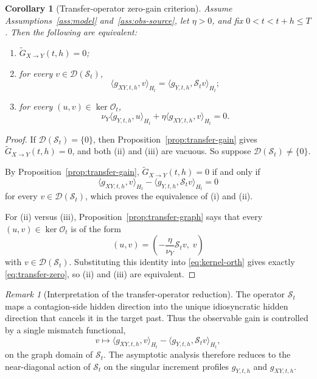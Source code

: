 \documentclass[11pt,a4paper]{amsart}
\theoremstyle{plain}
\newtheorem{corollary}[theorem]{Corollary}
\theoremstyle{definition}
\theoremstyle{remark}
\newtheorem{remark}[theorem]{Remark}
\begin{document}
\begin{corollary}[Transfer-operator zero-gain criterion]
\label{cor:transfer-zero}
Assume Assumptions~\ref{ass:model} and~\ref{ass:obs-source}, let $\eta>0$, and fix
$0<t<t+h\le T$. Then the following are equivalent:
\begin{enumerate}[label=(\roman*)]
\item $\widetilde G_{X\to Y}(t,h)=0$;
\item for every $v\in\mathcal D(\mathcal S_t)$,
\begin{equation}\label{eq:transfer-zero}
\langle g_{XY,t,h},v\rangle_{H_t}
=
\langle g_{Y,t,h},\mathcal S_t v\rangle_{H_t};
\end{equation}
\item for every $(u,v)\in\ker \mathcal O_t$,
\begin{equation}\label{eq:kernel-orth}
\nu_Y\langle g_{Y,t,h},u\rangle_{H_t}
+ \eta\langle g_{XY,t,h},v\rangle_{H_t}=0.
\end{equation}
\end{enumerate}
\end{corollary}

\begin{proof}
If $\mathcal D(\mathcal S_t)=\{0\}$, then Proposition~\ref{prop:transfer-gain} gives
$\widetilde G_{X\to Y}(t,h)=0$, and both (ii) and (iii) are vacuous. So suppose
$\mathcal D(\mathcal S_t)\neq\{0\}$.

By Proposition~\ref{prop:transfer-gain}, $\widetilde G_{X\to Y}(t,h)=0$ if and only if
\[
\langle g_{XY,t,h},v\rangle_{H_t}
-\langle g_{Y,t,h},\mathcal S_t v\rangle_{H_t}
=
0
\]
for every $v\in\mathcal D(\mathcal S_t)$, which proves the equivalence of (i) and (ii).

For (ii) versus (iii), Proposition~\ref{prop:transfer-graph} says that every
$(u,v)\in\ker \mathcal O_t$ is of the form
\[
(u,v)=\left(-\frac{\eta}{\nu_Y}\mathcal S_t v,\; v\right)
\]
with $v\in\mathcal D(\mathcal S_t)$. Substituting this identity into
\eqref{eq:kernel-orth} gives exactly \eqref{eq:transfer-zero}, so (ii) and (iii) are
equivalent.
\end{proof}

\begin{remark}[Interpretation of the transfer-operator reduction]
The operator $\mathcal S_t$ maps a contagion-side hidden direction into the unique
idiosyncratic hidden direction that cancels it in the target past. Thus the observable gain
is controlled by a single mismatch functional,
\[
v\mapsto
\langle g_{XY,t,h},v\rangle_{H_t}
-\langle g_{Y,t,h},\mathcal S_t v\rangle_{H_t},
\]
on the graph domain of $\mathcal S_t$. The asymptotic analysis therefore reduces to the
near-diagonal action of $\mathcal S_t$ on the singular increment profiles
$g_{Y,t,h}$ and $g_{XY,t,h}$.
\end{remark}
\end{document}
